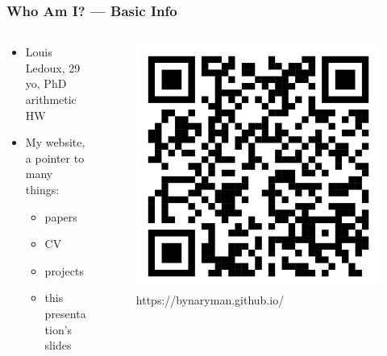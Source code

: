 \begin{frame}
	\frametitle{Who Am I? — Basic Info}
	\begin{columns}
	\begin{column}{0.65\textwidth}
		\begin{itemize}
			\item Louis Ledoux, 29 yo, PhD arithmetic HW
			\item My website, a pointer to many things:
			\begin{itemize}
				\item papers
				\item CV
				\item projects
				\item this presentation's slides
			\end{itemize}
		\end{itemize}
	\end{column}
	\begin{column}{0.35\textwidth}
		\begin{figure}[H]
			\centering
			\includegraphics[width=\textwidth]{QR-Mysite.png}
			\caption{https://bynaryman.github.io/}
			\label{fig:qr_website}
		\end{figure}
	\end{column}
	\end{columns}
\end{frame}

